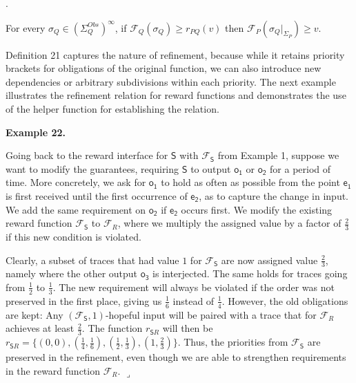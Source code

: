  
 
\par{}. 
 
For every $\sigma_{Q}\in(\Sigma_{Q}^{Obs})^{\infty}$, if $\mathcal{F}_{Q}(\sigma_{Q})\geq r_{PQ}(v)$ then $\mathcal{F}_{P}(\sigma_{Q}|_{\Sigma_{P}})\geq v$.\par
 
 
  
 
 
 
Definition 21 captures the nature of refinement, because while it retains priority brackets for obligations of the original function, we can also introduce new dependencies or arbitrary subdivisions within each priority. The next example illustrates the refinement relation for reward functions and demonstrates the use of the helper function for establishing the relation.\par
 
 
 
\par\medskip\noindent\textbf{Example 22.}\par
 
 
Going back to the reward interface for $\mathsf{S}$ with $\mathcal{F}_{\mathsf{S}}$ from Example 1, suppose we want to modify the guarantees, requiring $\mathsf{S}$ to output $\mathsf{o_{1}}$ or $\mathsf{o_{2}}$ for a period of time. More concretely, we ask for $\mathsf{o_{1}}$ to hold as often as possible from the point $\mathsf{e_{1}}$ is first received until the first occurrence of $\mathsf{e_{2}}$, as to capture the change in input. We add the same requirement on $\mathsf{o_{2}}$ if $\mathsf{e_{2}}$ occurs first. We modify the existing reward function $\mathcal{F}_{\mathsf{S}}$ to $\mathcal{F}_{R}$, where we multiply the assigned value by a factor of $\frac{2}{3}$ if this new condition is violated.\par
 
 
 
Clearly, a subset of traces that had value $1$ for $\mathcal{F}_{\mathsf{S}}$ are now assigned value $\frac{2}{3}$, namely where the other output $\mathsf{o_{3}}$ is interjected. The same holds for traces going from $\frac{1}{2}$ to $\frac{1}{3}$. The new requirement will always be violated if the order was not preserved in the first place, giving us $\frac{1}{6}$ instead of $\frac{1}{4}$. However, the old obligations are kept: Any $(\mathcal{F}_{\mathsf{S}},1)$-hopeful input will be paired with a trace that for $\mathcal{F}_{R}$ achieves at least $\frac{2}{3}$. The function $r_{\mathsf{S}R}$ will then be $r_{\mathsf{S}R}=\{(0,0),(\frac{1}{4},\frac{1}{6}),(\frac{1}{2},\frac{1}{3}),(1,\frac{2}{3})\}$. Thus, the priorities from $\mathcal{F}_{\mathsf{S}}$ are preserved in the refinement, even though we are able to strengthen requirements in the reward function $\mathcal{F}_{R}$. $\lrcorner$\par
 
